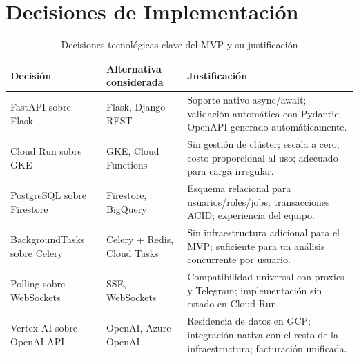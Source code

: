 \section{Decisiones de Implementación}

\begin{table}[H]
\centering
\caption{Decisiones tecnológicas clave del MVP y su justificación}
\label{tab:decisiones_impl}
\begin{tabular}{p{3.5cm} p{4.5cm} p{5cm}}
\toprule
\textbf{Decisión} & \textbf{Alternativa considerada} & \textbf{Justificación} \\
\midrule
FastAPI sobre Flask &
    Flask, Django REST &
    Soporte nativo async/await; validación automática con Pydantic;
    OpenAPI generado automáticamente. \\
Cloud Run sobre GKE &
    GKE, Cloud Functions &
    Sin gestión de clúster; escala a cero; costo proporcional al uso;
    adecuado para carga irregular. \\
PostgreSQL sobre Firestore &
    Firestore, BigQuery &
    Esquema relacional para usuarios/roles/jobs; transacciones ACID;
    experiencia del equipo. \\
BackgroundTasks sobre Celery &
    Celery + Redis, Cloud Tasks &
    Sin infraestructura adicional para el MVP; suficiente para
    un análisis concurrente por usuario. \\
Polling sobre WebSockets &
    SSE, WebSockets &
    Compatibilidad universal con proxies y Telegram;
    implementación sin estado en Cloud Run. \\
Vertex AI sobre OpenAI API &
    OpenAI, Azure OpenAI &
    Residencia de datos en GCP; integración nativa con el resto de
    la infraestructura; facturación unificada. \\
\bottomrule
\end{tabular}
\end{table}
